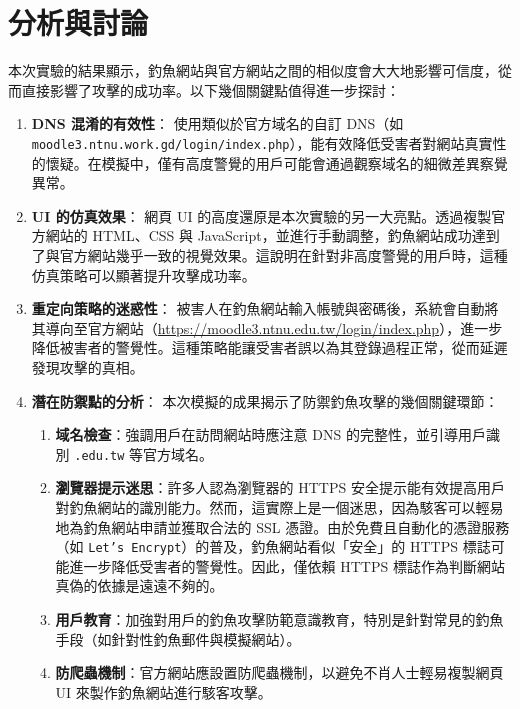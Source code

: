 \documentclass[a4paper,12pt]{article}
\begin{document}
\section{分析與討論}

本次實驗的結果顯示，釣魚網站與官方網站之間的相似度會大大地影響可信度，從而直接影響了攻擊的成功率。以下幾個關鍵點值得進一步探討：

\begin{enumerate}
	
    \item \textbf{DNS 混淆的有效性}：   
    使用類似於官方域名的自訂 DNS（如 \texttt{moodle3.ntnu.work.gd/login/index.php}），能有效降低受害者對網站真實性的懷疑。在模擬中，僅有高度警覺的用戶可能會通過觀察域名的細微差異察覺異常。
    
    \item \textbf{UI 的仿真效果}：  
    網頁 UI 的高度還原是本次實驗的另一大亮點。透過複製官方網站的 HTML、CSS 與 JavaScript，並進行手動調整，釣魚網站成功達到了與官方網站幾乎一致的視覺效果。這說明在針對非高度警覺的用戶時，這種仿真策略可以顯著提升攻擊成功率。
    
    \item \textbf{重定向策略的迷惑性}：  
    被害人在釣魚網站輸入帳號與密碼後，系統會自動將其導向至官方網站（\url{https://moodle3.ntnu.edu.tw/login/index.php}），進一步降低被害者的警覺性。這種策略能讓受害者誤以為其登錄過程正常，從而延遲發現攻擊的真相。
    
    \item \textbf{潛在防禦點的分析}：  
    本次模擬的成果揭示了防禦釣魚攻擊的幾個關鍵環節：
    \begin{enumerate}
    
        \item \textbf{域名檢查}：強調用戶在訪問網站時應注意 DNS 的完整性，並引導用戶識別 \texttt{.edu.tw} 等官方域名。
        \item \textbf{瀏覽器提示迷思}：許多人認為瀏覽器的 HTTPS 安全提示能有效提高用戶對釣魚網站的識別能力。然而，這實際上是一個迷思，因為駭客可以輕易地為釣魚網站申請並獲取合法的 SSL 憑證。由於免費且自動化的憑證服務（如 \texttt{Let's Encrypt}）的普及，釣魚網站看似「安全」的 HTTPS 標誌可能進一步降低受害者的警覺性。因此，僅依賴 HTTPS 標誌作為判斷網站真偽的依據是遠遠不夠的。
        \item \textbf{用戶教育}：加強對用戶的釣魚攻擊防範意識教育，特別是針對常見的釣魚手段（如針對性釣魚郵件與模擬網站）。
        \item \textbf{防爬蟲機制}：官方網站應設置防爬蟲機制，以避免不肖人士輕易複製網頁 UI 來製作釣魚網站進行駭客攻擊。
    
    \end{enumerate}

\end{enumerate}
\end{document}
